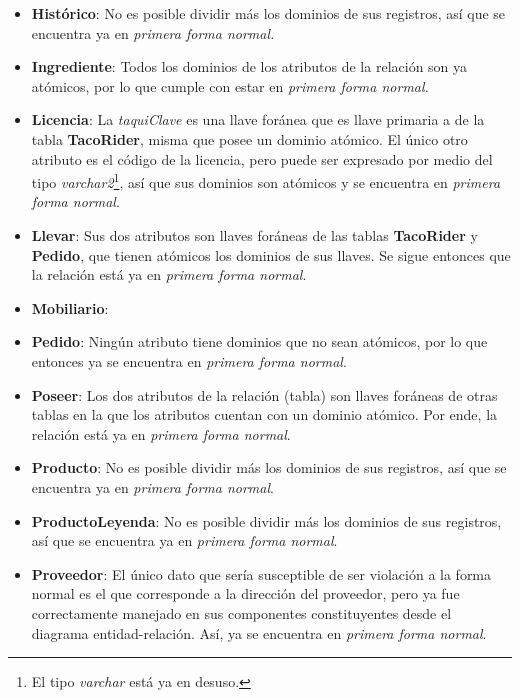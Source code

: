 \documentclass[11pt,letterpaper]{article}
\begin{document}
\begin{itemize}
\item \textbf{Histórico}: No es posible dividir más los dominios de sus registros,
así que se encuentra ya en \textit{primera forma normal.}
\item \textbf{Ingrediente}: Todos los dominios de los atributos de la relación son ya atómicos, por lo que cumple con estar en \textit{primera forma normal.}
\item \textbf{Licencia}: La \textit{taquiClave} es una llave foránea que es llave primaria a de la tabla \textbf{TacoRider}, misma que posee un dominio atómico. El único otro atributo es el código de la licencia, pero puede ser expresado por medio del tipo \textit{varchar2}\footnote{El tipo \textit{varchar} está ya en desuso.}, así que sus dominios son atómicos y se encuentra en \textit{primera forma normal}.
\item \textbf{Llevar}: Sus dos atributos son llaves foráneas de las tablas \textbf{TacoRider} y \textbf{Pedido}, que tienen atómicos los dominios de sus llaves. Se sigue entonces que la relación está ya en \textit{primera forma normal}.
\item \textbf{Mobiliario}:

\item \textbf{Pedido}: Ningún atributo tiene dominios que no sean atómicos, por lo que entonces ya se encuentra en \textit{primera forma normal}.
\item \textbf{Poseer}: Los dos atributos de la relación (tabla) son llaves foráneas de otras tablas en la que los atributos cuentan con un dominio atómico. Por ende, la relación está ya en \textit{primera forma normal}.
\item \textbf{Producto}: No es posible dividir más los dominios de sus registros, así
que se encuentra ya en \textit{primera forma normal}.
\item \textbf{ProductoLeyenda}: No es posible dividir más los dominios de sus registros, así
que se encuentra ya en \textit{primera forma normal}.
\item \textbf{Proveedor}: El único dato que sería susceptible de ser violación a la forma normal es el que corresponde a la dirección del proveedor, pero ya fue correctamente manejado en sus componentes constituyentes desde el diagrama entidad-relación. Así, ya se encuentra en \textit{primera forma normal}.


\end{itemize}
\end{document}

